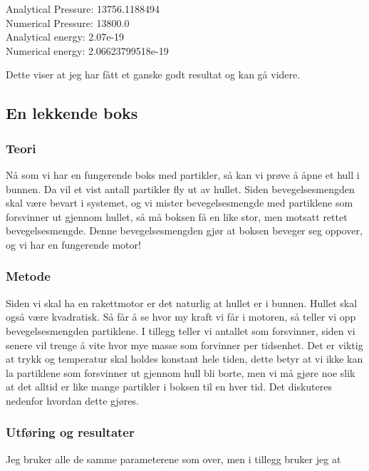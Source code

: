 \documentclass[a4paper,norsk,11pt,twoside]{article}
\begin{document}
\begin{tcolorbox}
Analytical Pressure:  13756.1188494 \\
Numerical Pressure:  13800.0 \\
Analytical energy:  2.07e-19 \\
Numerical energy:  2.06623799518e-19 
\end{tcolorbox}

Dette viser at jeg har fått et ganske godt resultat og kan gå videre.

\subsection{En lekkende boks}

\subsubsection{Teori}

Nå som vi har en fungerende boks med partikler, så kan vi prøve å åpne et hull i bunnen. Da vil et vist antall partikler fly ut av hullet. Siden bevegelsesmengden skal være bevart i systemet, og vi mister bevegelsesmengde med partiklene som forsvinner ut gjennom hullet, så må boksen få en like stor, men motsatt rettet bevegelsesmengde. Denne bevegelsesmengden gjør at boksen beveger seg oppover, og vi har en fungerende motor!

\subsubsection{Metode}

Siden vi skal ha en rakettmotor er det naturlig at hullet er i bunnen. Hullet skal også være kvadratisk. Så får å se hvor my kraft vi får i motoren, så teller vi opp bevegelsesmengden partiklene. I tillegg teller vi antallet som forsvinner, siden vi senere vil trenge å vite hvor mye masse som forvinner per tidsenhet. Det er viktig at trykk og temperatur skal holdes konstant hele tiden, dette betyr at vi ikke kan la partiklene som forsvinner ut gjennom hull bli borte, men vi må gjøre noe slik at det alltid er like mange partikler i boksen til en hver tid. Det diskuteres nedenfor hvordan dette gjøres.

\subsubsection{Utføring og resultater}
Jeg bruker alle de samme parameterene som over, men i tillegg bruker jeg at
\end{document}
